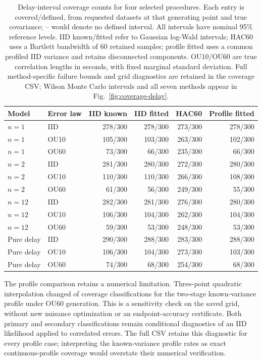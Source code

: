 \documentclass[11pt]{article}
\begin{document}
\begin{table}[tbp]
\centering\small
\begin{tabular}{llrrrr}
\toprule
Model & Error law & IID known & IID fitted & HAC60 & Profile fitted \\
\midrule
$n=1$ & IID & 278/300 & 278/300 & 273/300 & 278/300 \\
$n=1$ & OU10 & 105/300 & 103/300 & 263/300 & 102/300 \\
$n=1$ & OU60 & 73/300 & 66/300 & 235/300 & 66/300 \\
$n=2$ & IID & 281/300 & 280/300 & 272/300 & 280/300 \\
$n=2$ & OU10 & 110/300 & 110/300 & 266/300 & 108/300 \\
$n=2$ & OU60 & 61/300 & 56/300 & 249/300 & 55/300 \\
$n=12$ & IID & 282/300 & 281/300 & 276/300 & 280/300 \\
$n=12$ & OU10 & 106/300 & 104/300 & 262/300 & 104/300 \\
$n=12$ & OU60 & 59/300 & 53/300 & 248/300 & 53/300 \\
Pure delay & IID & 290/300 & 288/300 & 283/300 & 288/300 \\
Pure delay & OU10 & 106/300 & 104/300 & 273/300 & 103/300 \\
Pure delay & OU60 & 74/300 & 68/300 & 254/300 & 68/300 \\
\bottomrule
\end{tabular}
\caption{Delay-interval coverage counts for four selected procedures. Each entry is covered/defined, from \CoverageReplicates{} requested datasets at that generating point and true covariance; -- would denote no defined interval. All intervals have nominal 95\% reference levels. IID known/fitted refer to Gaussian log-Wald intervals; HAC60 uses a Bartlett bandwidth of 60 retained samples; profile fitted uses a common profiled IID variance and retains disconnected components. OU10/OU60 are true correlation lengths in seconds, with fixed marginal standard deviation. Full method-specific failure bounds and grid diagnostics are retained in the coverage CSV; Wilson Monte Carlo intervals and all seven methods appear in Fig.~\ref{fig:coverage-delay}.}
\label{tab:coverage-delay}
\end{table}



The profile comparison retains a numerical limitation. Three-point quadratic
interpolation changed \CoverageTwoStageOUKnownGridChanges{} of
\CoverageReplicates{} coverage classifications for the two-stage known-variance
profile under OU60 generation. This is a sensitivity check on the saved grid,
without new nuisance optimization or an endpoint-accuracy certificate. Both
primary and secondary classifications remain conditional diagnostics of an IID
likelihood applied to correlated errors. The full CSV retains this diagnostic
for every profile case; interpreting the known-variance profile rates as exact
continuous-profile coverage would overstate their numerical verification.
\end{document}
